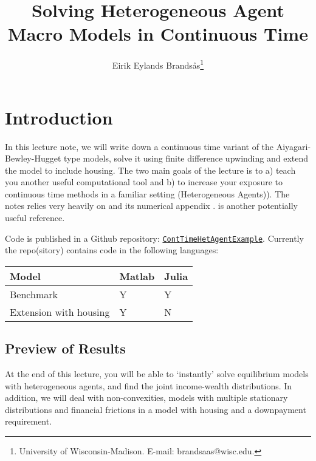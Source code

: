 \documentclass[12pt]{article}
\title{\vspace{-7ex}Solving Heterogeneous Agent Macro Models in Continuous Time}
\author{Eirik Eylands Brands\aa s\thanks{University  of  Wisconsin-Madison.  E-mail: brandsaas@wisc.edu. }}
\DeclareMathOperator{\1}{\mathbbm{1}}
\begin{document}
\maketitle

\section{Introduction}
In this lecture note, we will write down a continuous time variant of the Aiyagari-Bewley-Hugget type models, solve it using finite difference upwinding and extend the model to include housing. The  two main goals of the lecture is to a) teach you another useful computational tool and b) to increase your exposure to continuous time methods in a familiar setting (Heterogeneous Agents)). The notes relies very heavily on \cite{Achdou2017} and its numerical appendix \citep{Achdou2017a}. \cite{Candler1999} is another potentially useful reference.

Code is published in a Github repository: \href{https://github.com/eirikeb/ContTimeHetAgentExample/}{\texttt{ContTimeHetAgentExample}}. Currently the repo(sitory) contains code in the following languages:

\begin{table}[h]\center
\begin{tabular}{@{}lll@{}} \toprule
Model         &  Matlab     & Julia  \\ \midrule
Benchmark     &  Y& Y \\
Extension with housing & Y &  N \\ \bottomrule
\end{tabular}
\end{table}

\subsection{Preview of Results}
At the end of this lecture, you will be able to `instantly' solve equilibrium models with heterogeneous agents, and find the joint income-wealth distributions. In addition, we will deal with non-convexities, models with multiple stationary distributions and financial frictions in a model with housing and a downpayment requirement.
\end{document}
